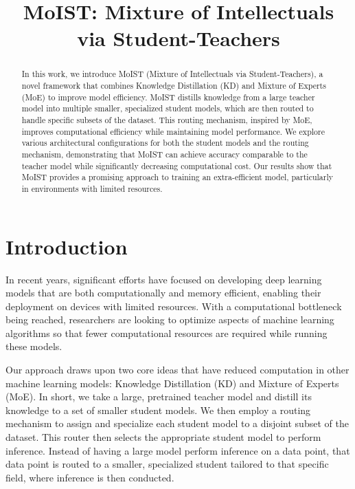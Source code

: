 \documentclass[conference]{IEEEtran}
\begin{document}
\title{MoIST: Mixture of Intellectuals via Student-Teachers}

\author{
  \and
  \and
  \and
}

\maketitle

\begin{abstract}
  In this work, we introduce MoIST (Mixture of Intellectuals via Student-Teachers), a novel framework that combines Knowledge Distillation (KD) and Mixture of Experts (MoE) to improve model efficiency. MoIST distills knowledge from a large teacher model into multiple smaller, specialized student models, which are then routed to handle specific subsets of the dataset. This routing mechanism, inspired by MoE, improves computational efficiency while maintaining model performance. We explore various architectural configurations for both the student models and the routing mechanism, demonstrating that MoIST can achieve accuracy comparable to the teacher model while significantly decreasing computational cost. Our results show that MoIST provides a promising approach to training an extra-efficient model, particularly in environments with limited resources.
\end{abstract}

\section{Introduction}
In recent years, significant efforts have focused on developing deep learning models that are both computationally and memory efficient, enabling their deployment on devices with limited resources. With a computational bottleneck being reached, researchers are looking to optimize aspects of machine learning algorithms so that fewer computational resources are required while running these models.

Our approach draws upon two core ideas that have reduced computation in other machine learning models: Knowledge Distillation (KD) and Mixture of Experts (MoE). In short, we take a large, pretrained teacher model and distill its knowledge to a set of smaller student models. We then employ a routing mechanism to assign and specialize each student model to a disjoint subset of the dataset. This router then selects the appropriate student model to perform inference. Instead of having a large model perform inference on a data point, that data point is routed to a smaller, specialized student tailored to that specific field, where inference is then conducted.
\end{document}
